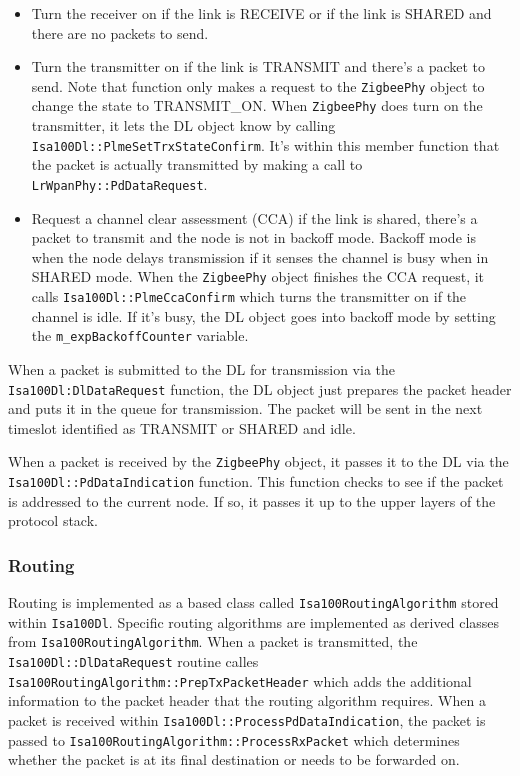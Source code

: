 \documentclass[12pt,letterpaper]{article}
\begin{document}
\begin{itemize}
\item Turn the receiver on if the link is RECEIVE or if the link is SHARED and there are no packets to send.

\item Turn the transmitter on if the link is TRANSMIT and there's a packet to send.  Note that function only makes a request to the {\tt ZigbeePhy} object to change the state to TRANSMIT\_ON.  When {\tt ZigbeePhy} does turn on the transmitter, it lets the DL object know by calling {\tt Isa100Dl::PlmeSetTrxStateConfirm}.  It's within this member function that the packet is actually transmitted by making a call to {\tt LrWpanPhy::PdDataRequest}.


\item Request a channel clear assessment (CCA) if the link is shared, there's a packet to transmit and the node is not in backoff mode.  Backoff mode is when the node delays transmission if it senses the channel is busy when in SHARED mode.  When the {\tt ZigbeePhy} object finishes the CCA request, it calls {\tt Isa100Dl::PlmeCcaConfirm} which turns the transmitter on if the channel is idle.  If it's busy, the DL object goes into backoff mode by setting the {\tt m\_expBackoffCounter} variable.

\end{itemize}

When a packet is submitted to the DL for transmission via the {\tt Isa100Dl:DlDataRequest} function, the DL object just prepares the packet header and puts it in the queue for transmission.  The packet will be sent in the next timeslot identified as TRANSMIT or SHARED and idle.

When a packet is received by the {\tt ZigbeePhy} object, it passes it to the DL via the {\tt Isa100Dl::PdDataIndication} function.  This function checks to see if the packet is addressed to the current node.  If so, it passes it up to the upper layers of the protocol stack.


\subsubsection{Routing}

Routing is implemented as a based class called {\tt Isa100RoutingAlgorithm} stored within {\tt Isa100Dl}. Specific routing algorithms are implemented as derived classes from {\tt Isa100RoutingAlgorithm}.  When a packet is transmitted, the {\tt Isa100Dl::DlDataRequest} routine calles {\tt Isa100RoutingAlgorithm::PrepTxPacketHeader} which adds the additional information to the packet header that the routing algorithm requires.  When a packet is received within {\tt Isa100Dl::ProcessPdDataIndication}, the packet is passed to {\tt Isa100RoutingAlgorithm::ProcessRxPacket} which determines whether the packet is at its final destination or needs to be forwarded on.
\end{document}
